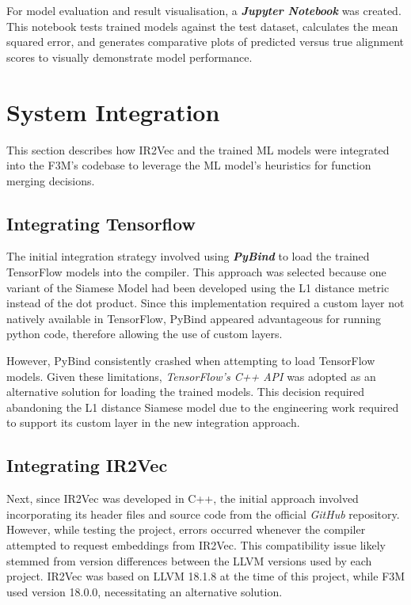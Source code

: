 For model evaluation and result visualisation, a \textbf{\textit{Jupyter Notebook}} was created. This notebook tests trained models against the test dataset, calculates the mean squared error, and generates comparative plots of predicted versus true alignment scores to visually demonstrate model performance.

\section{System Integration}
This section describes how IR2Vec and the trained ML models were integrated into the F3M's codebase to leverage the ML model's heuristics for function merging decisions.

\subsection{Integrating Tensorflow}
The initial integration strategy involved using \textbf{\textit{PyBind}} to load the trained TensorFlow models into the compiler. This approach was selected because one variant of the Siamese Model had been developed using the L1 distance metric instead of the dot product. Since this implementation required a custom layer not natively available in TensorFlow, PyBind appeared advantageous for running python code, therefore allowing the use of custom layers.

However, PyBind consistently crashed when attempting to load TensorFlow models. Given these limitations, \textit{TensorFlow's C++ API} was adopted as an alternative solution for loading the trained models. This decision required abandoning the L1 distance Siamese model due to the engineering work required to support its custom layer in the new integration approach.

\subsection{Integrating IR2Vec}
Next, since IR2Vec was developed in C++, the initial approach involved incorporating its header files and source code from the official \textit{GitHub} repository. However, while testing the project, errors occurred whenever the compiler attempted to request embeddings from IR2Vec. This compatibility issue likely stemmed from version differences between the LLVM versions used by each project. IR2Vec was based on LLVM 18.1.8 at the time of this project, while F3M used version 18.0.0, necessitating an alternative solution.


